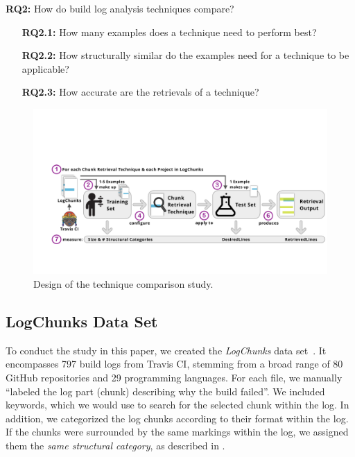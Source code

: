 \begin{simplebox}[minipage boxed title*=-1.5cm,
attach boxed title to top center={yshift=-6mm}]
{\textbf{RQ2:} How do build log analysis techniques compare?}
\begin{itemize}[leftmargin=1.2cm]
  \item[\textbf{RQ2.1:}] How many examples does a technique need to
  perform best?
  \item[\textbf{RQ2.2:}] How structurally similar do the examples
  need for a technique to be applicable?
  \item[\textbf{RQ2.3:}] How accurate are the retrievals of a technique?
\end{itemize}
\end{simplebox}

\begin{figure}[tb]
	\centering
	\includegraphics[width=\textwidth, trim={1.6cm 2.5cm 0.2cm 4.8cm},
  clip]{img/study.pdf}
	\caption{Design of the technique comparison study.}
	\label{fig:study}
\end{figure}


\subsection{LogChunks Data Set}
\label{sec:logchunks}
To conduct the study in this paper, we created the
\emph{LogChunks} data set~\cite{brandt2020logchunks}.
It encompasses 797 build logs from Travis CI,
stemming from a broad range of 80 GitHub repositories and 29
programming languages.
For each file, we manually ``labeled
the log part (chunk) describing why the build
failed''.
We included keywords, which we
would use to search for the selected chunk within the log.
In
addition, we categorized the log chunks according to their format
within the log.
If the chunks were surrounded by the same markings
within the log, we assigned them the \emph{same structural category},
as described in .

